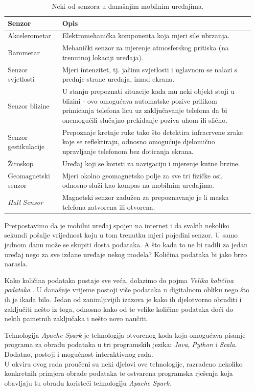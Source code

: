 \documentclass[times, utf8, zavrsni]{fer}
\begin{document}
\begin{table}[htb]
\caption{Neki od senzora u današnjim mobilnim uređajima.}
\label{tbl:senzori}
\centering
\begin{tabular}{l p{8cm}}
\hline
Senzor & Opis \\
\hline
Akcelerometar & Elektromehanička komponenta koja mjeri sile ubrzanja. \\
Barometar & Mehanički senzor za mjerenje atmosferskog pritiska (na trenutnoj lokaciji uređaja).\\
Senzor svjetlosti & Mjeri intenzitet, tj. jačinu svjetlosti i uglavnom se nalazi s prednje strane uređaja, iznad ekrana. \\
Senzor blizine & U stanju prepoznati situacije kada mu neki objekt stoji u blizini - ovo omogućava automatske pozive prilikom primicanja telefona licu uz zaključavanje telefona da bi onemogućili slučajno prekidanje poziva uhom ili slično.\\
Senzor gestikulacije & Prepoznaje kretnje ruke tako što detektira infracrvene zrake koje se reflektiraju, odnosno omogućuje djelomično upravljanje telefonom bez doticanja ekrana.\\
Žiroskop & Uređaj koji se koristi za navigaciju i mjerenje kutne brzine.\\
Geomagnetski senzor & Mjeri okolno geomagnetsko polje za sve tri fizičke osi, odnosno služi kao kompas na mobilnim uređajima. \\
\emph{Hall Sensor} & Magnetski senzor zadužen za prepoznavanje je li  maska telefona zatvorena ili otvorena. \\
\hline
\end{tabular}
\end{table}

Pretpostavimo da je mobilni uređaj spojen na internet i da svakih nekoliko sekundi pošalje vrijednost koju u tom trenutku mjeri pojedini senzor. U samo jednom danu može se skupiti dosta podataka. A što kada to ne bi radili za jedan uređaj nego za sve izdane uređaje nekog modela? Količina podataka bi jako brzo narasla.

Kako količina podataka postaje sve veća, dolazimo do pojma \emph{Velika količina podataka} . U današnje vrijeme postoji više podataka u digitalnom obliku nego što ih je ikada bilo. Jedan od zanimljivijih izazova je kako ih djelotvorno obraditi i zaključiti nešto iz toga, odnosno kako od te velike količine podataka doći do nekih pametnih zaključaka i nešto novo naučiti.

Tehnologija \emph{Apache Spark} je tehnologija otvorenog koda  koja omogućava pisanje programa za obradu podataka u tri programskih jezika: \emph{Java}, \emph{Python} i  \emph{Scala}. Dodatno, postoji i mogućnost interaktivnog rada. \\
U okviru ovog rada proučeni su neki djelovi ove tehnologije, razrađeno nekoliko konkretnih primjera obrade podataka te ostvarena programska rješenja koja obavljaju tu obradu koristeći tehnologiju \emph{Apache Spark}.
\end{document}
